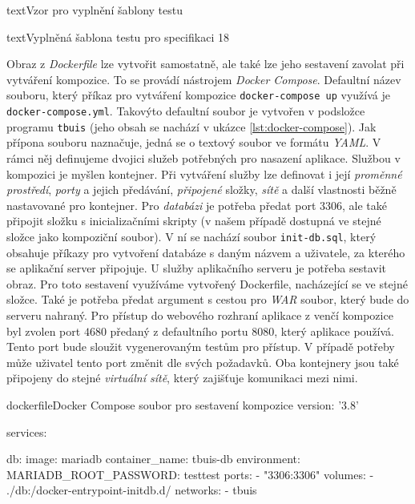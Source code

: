 \documentclass[czech, ma, kiv, he, iso690numb, pdf, viewonly]{fasthesis}
\begin{document}
\begin{code}{text}{Vzor pro vyplnění šablony testu \label{lst:template}}
{\begin{code}{text}{Vyplněná šablona testu pro specifikaci 18 \label{lst:spec18}}
{    

    Obraz z \textit{Dockerfile} lze vytvořit samostatně, ale také lze jeho sestavení zavolat při vytváření kompozice. To se provádí nástrojem \textit{Docker Compose}. Defaultní název souboru, který příkaz pro vytváření kompozice \verb|docker-compose up| využívá je \verb|docker-compose.yml|. Takovýto defaultní soubor je vytvořen v podsložce programu \verb|tbuis| (jeho obsah se nachází v ukázce \ref{lst:docker-compose}). Jak přípona souboru naznačuje, jedná se o textový soubor ve formátu \textit{YAML}. V rámci něj definujeme dvojici služeb potřebných pro nasazení aplikace. Službou v kompozici je myšlen kontejner. Při vytváření služby lze definovat i její \textit{proměnné prostředí}, \textit{porty} a jejich předávání, \textit{připojené} složky, \textit{sítě} a další vlastnosti běžně nastavované pro kontejner. Pro \textit{databázi} je potřeba předat port \(3306\), ale také připojit složku s inicializačními skripty (v našem případě dostupná ve stejné složce jako kompoziční soubor). V ní se nachází soubor \verb|init-db.sql|, který obsahuje příkazy pro vytvoření databáze s daným názvem a uživatele, za kterého se aplikační server připojuje. U služby aplikačního serveru je potřeba sestavit obraz. Pro toto sestavení využíváme vytvořený Dockerfile, nacházející se ve stejné složce. Také je potřeba předat argument s cestou pro \textit{WAR} soubor, který bude do serveru nahraný. Pro přístup do webového rozhraní aplikace z venčí kompozice byl zvolen port \(4680\) předaný z defaultního portu \(8080\), který aplikace používá. Tento port bude sloužit vygenerovaným testům pro přístup. V případě potřeby může uživatel tento port změnit dle svých požadavků. Oba kontejnery jsou také připojeny do stejné \textit{virtuální sítě}, který zajišťuje komunikaci mezi nimi. 

    \begin{code}{dockerfile}{Docker Compose soubor pro sestavení kompozice \label{lst:docker-compose}}
version: '3.8'

services: 

  db:
    image: mariadb
    container_name: tbuis-db
    environment: 
      MARIADB_ROOT_PASSWORD: testtest
    ports:
      - "3306:3306"
    volumes: 
      - ./db:/docker-entrypoint-initdb.d/
    networks:
      - tbuis


\end{code}}
\end{code}}
\end{code}
\end{document}
